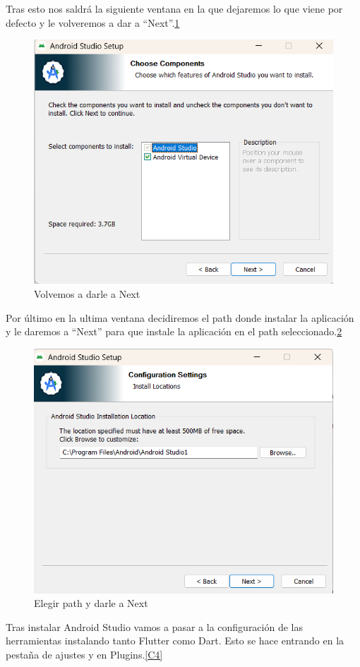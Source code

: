 Tras esto nos saldrá la siguiente ventana en la que dejaremos lo que viene por defecto y le volveremos a dar a ``Next''.\ref{C2}
\begin{figure}[H]
    \centering
    \includegraphics[width=0.8\linewidth]{AndroidStudio2.png}
    \caption{Volvemos a darle a Next}
    \label{C2}
\end{figure}

Por último en la ultima ventana decidiremos el path donde instalar la aplicación y le daremos a ``Next'' para que instale la aplicación en el path seleccionado.\ref{C3}
\begin{figure}[H]
    \centering
    \includegraphics[width=0.8\linewidth]{AndroidStudio3.png}
    \caption{Elegir path y darle a Next}
    \label{C3}
\end{figure}

Tras instalar Android Studio vamos a pasar a la configuración de las herramientas instalando tanto Flutter como Dart.
Esto se hace entrando en la pestaña de ajustes y en Plugins.\ref{C4}

